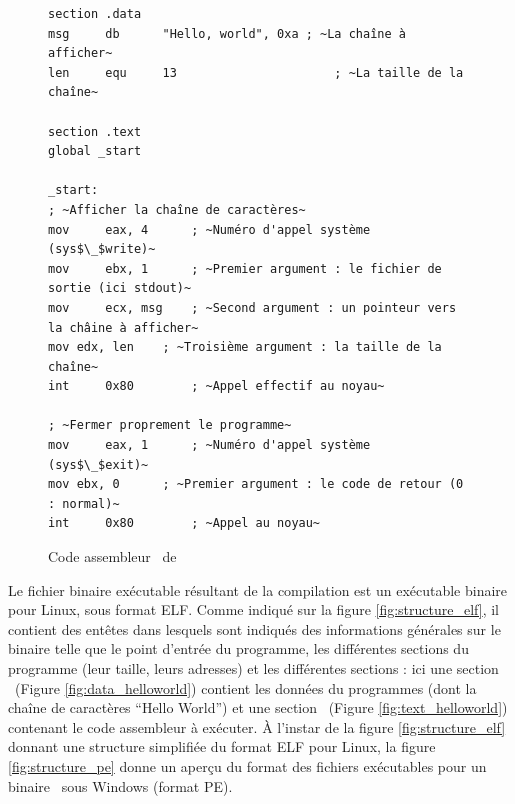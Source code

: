 \begin{figure}
\begin{lstlisting}[language={[x86masm]Assembler}, escapechar=~]
section .data
msg     db      "Hello, world", 0xa	; ~La chaîne à afficher~
len     equ     13                      ; ~La taille de la chaîne~

section .text
global _start

_start:
; ~Afficher la chaîne de caractères~
mov     eax, 4      ; ~Numéro d'appel système (sys$\_$write)~
mov     ebx, 1      ; ~Premier argument : le fichier de sortie (ici stdout)~
mov     ecx, msg    ; ~Second argument : un pointeur vers la châine à afficher~
mov	edx, len    ; ~Troisième argument : la taille de la chaîne~
int     0x80        ; ~Appel effectif au noyau~

; ~Fermer proprement le programme~
mov     eax, 1      ; ~Numéro d'appel système (sys$\_$exit)~
mov	ebx, 0	    ; ~Premier argument : le code de retour (0 : normal)~
int     0x80	    ; ~Appel au noyau~
\end{lstlisting}
\caption{Code assembleur \xq\ de \helloworld}
\label{fig:helloword_asm}
\end{figure}

Le fichier binaire exécutable résultant de la compilation est un exécutable binaire pour Linux, sous format ELF.
Comme indiqué sur la figure \ref{fig:structure_elf}, il contient des entêtes dans lesquels sont indiqués des informations générales sur le binaire telle que le point d'entrée du programme, les différentes sections du programme (leur taille, leurs adresses) et les différentes sections : ici une section \pdata\ (Figure \ref{fig:data_helloworld}) contient les données du programmes (dont la chaîne de caractères ``Hello World'') et une section \ptext\ (Figure \ref{fig:text_helloworld}) contenant le code assembleur à exécuter.
À l'instar de la figure \ref{fig:structure_elf} donnant une structure simplifiée du format ELF pour Linux, la figure \ref{fig:structure_pe} donne un aperçu du format des fichiers exécutables pour un binaire \xq\ sous Windows (format PE).

